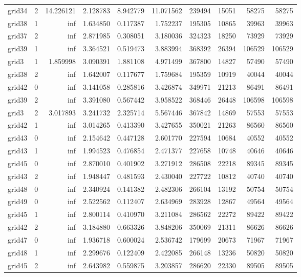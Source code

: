 \begin{longtable}{|l|r|r|r|r|r|r|r|r|r|}
grid34 & 2 & 14.226121 & 2.128783 & 8.942779 & 11.071562 & 239494 & 15051 & 58275 & 58275 \\
grid38 & 1 & inf & 1.634850 & 0.117387 & 1.752237 & 195305 & 10865 & 39963 & 39963 \\
grid37 & 2 & inf & 2.871985 & 0.308051 & 3.180036 & 324323 & 18250 & 73929 & 73929 \\
grid39 & 1 & inf & 3.364521 & 0.519473 & 3.883994 & 368392 & 26394 & 106529 & 106529 \\
grid3 & 1 & 1.859998 & 3.090391 & 1.881108 & 4.971499 & 367800 & 14827 & 57490 & 57490 \\
grid38 & 2 & inf & 1.642007 & 0.117677 & 1.759684 & 195359 & 10919 & 40044 & 40044 \\
grid42 & 0 & inf & 3.141058 & 0.285816 & 3.426874 & 349971 & 21213 & 86491 & 86491 \\
grid39 & 2 & inf & 3.391080 & 0.567442 & 3.958522 & 368446 & 26448 & 106598 & 106598 \\
grid3 & 2 & 3.017893 & 3.241732 & 2.325714 & 5.567446 & 367842 & 14869 & 57553 & 57553 \\
grid42 & 1 & inf & 3.014265 & 0.413390 & 3.427655 & 350021 & 21263 & 86560 & 86560 \\
grid43 & 0 & inf & 2.154642 & 0.447128 & 2.601770 & 227594 & 10684 & 40552 & 40552 \\
grid43 & 1 & inf & 1.994523 & 0.476854 & 2.471377 & 227658 & 10748 & 40646 & 40646 \\
grid45 & 0 & inf & 2.870010 & 0.401902 & 3.271912 & 286508 & 22218 & 89345 & 89345 \\
grid43 & 2 & inf & 1.948447 & 0.481593 & 2.430040 & 227722 & 10812 & 40740 & 40740 \\
grid48 & 0 & inf & 2.340924 & 0.141382 & 2.482306 & 266104 & 13192 & 50754 & 50754 \\
grid49 & 0 & inf & 2.522562 & 0.112407 & 2.634969 & 283928 & 12867 & 49564 & 49564 \\
grid45 & 1 & inf & 2.800114 & 0.410970 & 3.211084 & 286562 & 22272 & 89422 & 89422 \\
grid42 & 2 & inf & 3.184880 & 0.663326 & 3.848206 & 350069 & 21311 & 86626 & 86626 \\
grid47 & 0 & inf & 1.936718 & 0.600024 & 2.536742 & 179699 & 20673 & 71967 & 71967 \\
grid48 & 1 & inf & 2.299676 & 0.122409 & 2.422085 & 266148 & 13236 & 50820 & 50820 \\
grid45 & 2 & inf & 2.643982 & 0.559875 & 3.203857 & 286620 & 22330 & 89505 & 89505 \\

\end{longtable}

